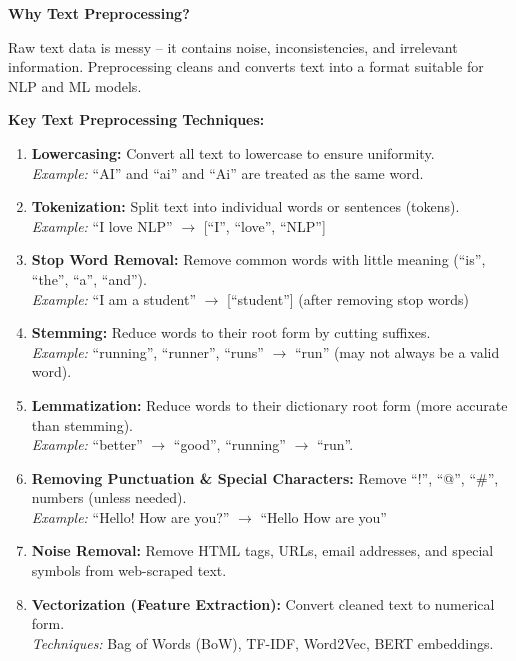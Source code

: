 \documentclass[12pt,a4paper]{article}
\newcommand{\term}[1]{\textbf{\color{headingcolor}#1}}
\begin{document}
\begin{answerenv}

\textbf{\color{headingcolor}Why Text Preprocessing?}

Raw text data is messy -- it contains noise, inconsistencies, and irrelevant information. Preprocessing cleans and converts text into a format suitable for NLP and ML models.

\vspace{6pt}
\textbf{\color{headingcolor}Key Text Preprocessing Techniques:}

\begin{enumerate}[leftmargin=1.8em, itemsep=5pt]
  \item \term{Lowercasing:} Convert all text to lowercase to ensure uniformity.\\
  \textit{Example:} ``AI'' and ``ai'' and ``Ai'' are treated as the same word.

  \item \term{Tokenization:} Split text into individual words or sentences (tokens).\\
  \textit{Example:} ``I love NLP'' $\to$ [``I'', ``love'', ``NLP'']

  \item \term{Stop Word Removal:} Remove common words with little meaning (``is'', ``the'', ``a'', ``and'').\\
  \textit{Example:} ``I am a student'' $\to$ [``student''] (after removing stop words)

  \item \term{Stemming:} Reduce words to their root form by cutting suffixes.\\
  \textit{Example:} ``running'', ``runner'', ``runs'' $\to$ ``run'' (may not always be a valid word).

  \item \term{Lemmatization:} Reduce words to their dictionary root form (more accurate than stemming).\\
  \textit{Example:} ``better'' $\to$ ``good'', ``running'' $\to$ ``run''.

  \item \term{Removing Punctuation \& Special Characters:} Remove ``!'', ``@'', ``\#'', numbers (unless needed).\\
  \textit{Example:} ``Hello! How are you?'' $\to$ ``Hello How are you''

  \item \term{Noise Removal:} Remove HTML tags, URLs, email addresses, and special symbols from web-scraped text.

  \item \term{Vectorization (Feature Extraction):} Convert cleaned text to numerical form.\\
  \textit{Techniques:} Bag of Words (BoW), TF-IDF, Word2Vec, BERT embeddings.
\end{enumerate}

\end{answerenv}
\end{document}

